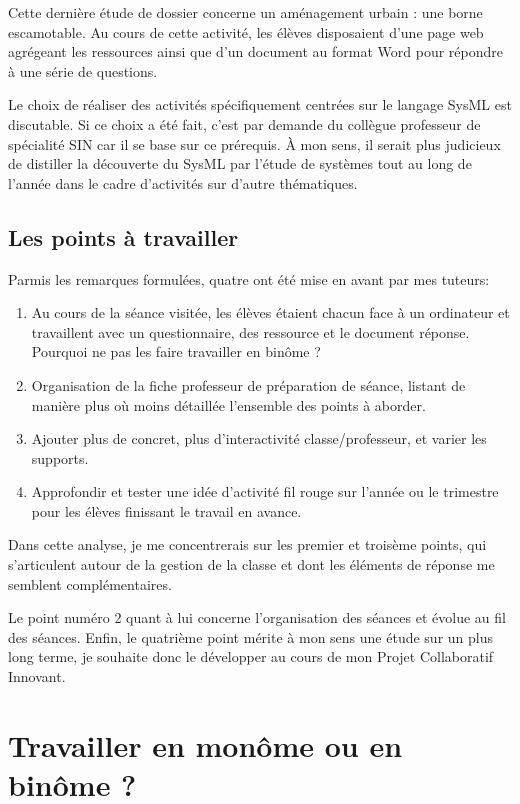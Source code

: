 \documentclass[pdftex,a4paper,12pt]{article}
\begin{document}
	Cette dernière étude de dossier concerne un aménagement urbain : une borne escamotable.
	Au cours de cette activité, les élèves disposaient d'une page web agrégeant les ressources ainsi que
	d'un document au format Word pour répondre à une série de questions. 
	
	Le choix de réaliser des activités spécifiquement centrées sur le langage SysML est discutable. 
	Si ce choix a été fait, c'est par demande du collègue professeur de spécialité SIN car il se base sur ce prérequis.
	À mon sens, il serait plus judicieux de distiller la découverte du SysML par l'étude de systèmes tout au long de l'année 
	dans le cadre d'activités sur d'autre thématiques.

	\subsection{Les points à travailler}
	Parmis les remarques formulées, quatre ont été mise en avant par mes tuteurs:
	\begin{enumerate}
		\item Au cours de la séance visitée, les élèves étaient chacun face à un ordinateur et travaillent avec un questionnaire, des ressource et le document réponse. 
			Pourquoi ne pas les faire travailler en binôme ?
		\item Organisation de la fiche professeur de préparation de séance, listant de manière plus où moins détaillée l'ensemble des points à aborder.
		\item Ajouter plus de concret, plus d'interactivité classe/professeur, et varier les supports.
		\item Approfondir et tester une idée d'activité \og{}fil rouge\fg{} sur l'année ou le trimestre pour les élèves finissant le travail en avance.
	\end{enumerate}

	Dans cette analyse, je me concentrerais sur les premier et troisème points, qui s'articulent autour de la gestion de la classe 
	et dont les éléments de réponse me semblent complémentaires.

	Le point numéro 2 quant à lui concerne l'organisation des séances et évolue au fil des séances.
	Enfin, le quatrième point mérite à mon sens une étude sur un plus long terme, je souhaite donc le développer au cours de mon \og{}Projet Collaboratif Innovant\fg{}.

	\section{Travailler en monôme ou en binôme ?}
\end{document}
